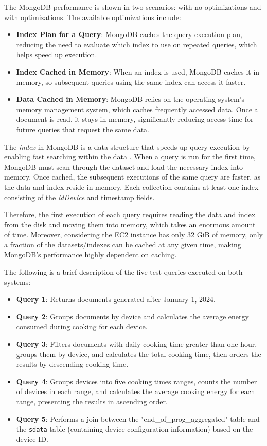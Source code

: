 The MongoDB performance is shown in two scenarios: with no optimizations and with optimizations. The available optimizations include:

\begin{itemize}
    \item \textbf{Index Plan for a Query}: MongoDB caches the query execution plan, reducing the need to evaluate which index to use on repeated queries, which helps speed up execution.
    \item \textbf{Index Cached in Memory}: When an index is used, MongoDB caches it in memory, so subsequent queries using the same index can access it faster.
    \item \textbf{Data Cached in Memory}: MongoDB relies on the operating system's memory management system, which caches frequently accessed data. Once a document is read, it stays in memory, significantly reducing access time for future queries that request the same data.
\end{itemize}

The \textit{index} in MongoDB is a data structure that speeds up query execution by enabling fast searching within the data \cite{chopade2020mongodb}. When a query is run for the first time, MongoDB must scan through the dataset and load the necessary index into memory. Once cached, the subsequent executions of the same query are faster, as the data and index reside in memory. Each collection contains at least one index consisting of the \textit{idDevice} and timestamp fields.

Therefore, the first execution of each query requires reading the data and index from the disk and moving them into memory, which takes an enormous amount of time. Moreover, considering the \ac{EC2} instance has only 32 GiB of memory, only a fraction of the datasets/indexes can be cached at any given time, making MongoDB's performance highly dependent on caching.

The following is a brief description of the five test queries executed on both systems:

\begin{itemize}
    \item \textbf{Query 1}: Returns documents generated after January 1, 2024.
    \item \textbf{Query 2}: Groups documents by device and calculates the average energy consumed during cooking for each device.
    \item \textbf{Query 3}: Filters documents with daily cooking time greater than one hour, groups them by device, and calculates the total cooking time, then orders the results by descending cooking time.
    \item \textbf{Query 4}: Groups devices into five cooking times ranges, counts the number of devices in each range, and calculates the average cooking energy for each range, presenting the results in ascending order.
    \item \textbf{Query 5}: Performs a join between the "end\_of\_prog\_aggregated" table and the \texttt{sdata} table (containing device configuration information) based on the device ID.
\end{itemize}

